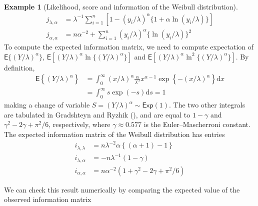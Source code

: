 \documentclass[
  11pt,
  letterpaper,
]{scrbook}
\theoremstyle{definition}
\theoremstyle{plain}
\theoremstyle{plain}
\theoremstyle{definition}
\newtheorem{example}{Example}[chapter]
\theoremstyle{definition}
\theoremstyle{remark}
\begin{document}
\begin{example}[Likelihood, score and information of the Weibull
distribution]
\begin{align*}
j_{\lambda, \alpha} &= \lambda^{-1}\sum_{i=1}^n [1-(y_i/\lambda)^\alpha\{1+\alpha\ln(y_i/\lambda)\}] \\
j_{\alpha,\alpha} &= n\alpha^{-2} + \sum_{i=1}^n (y_i/\lambda)^\alpha \{\ln(y_i/\lambda)\}^2
\end{align*} To compute the expected information matrix, we need to
compute expectation of \(\mathsf{E}\{(Y/\lambda)^\alpha\}\),
\(\mathsf{E}[(Y/\lambda)^\alpha\ln\{(Y/\lambda)^\alpha\}]\) and
\(\mathsf{E}[(Y/\lambda)^\alpha\ln^2\{(Y/\lambda)^\alpha\}]\). By
definition, \begin{align*}
\mathsf{E}\left\{(Y/\lambda)^\alpha\right\} & = \int_0^\infty (x/\lambda)^\alpha \frac{\alpha}{\lambda^\alpha} x^{\alpha-1}\exp\left\{-(x/\lambda)^\alpha\right\} \mathrm{d} x \\
 &= \int_0^\infty s\exp(-s) \mathrm{d} s =1
\end{align*} making a change of variable
\(S = (Y/\lambda)^\alpha\sim \mathsf{Exp}(1)\). The two other integrals
are tabulated in Gradshteyn and Ryzhik
(), and are equal to
\(1-\gamma\) and \(\gamma^2-2\gamma + \pi^2/6\), respectively, where
\(\gamma \approx 0.577\) is the Euler--Mascherroni constant. The
expected information matrix of the Weibull distribution has entries
\begin{align*}
i_{\lambda, \lambda} & = n \lambda^{-2}\alpha\left\{ (\alpha+1)-1\right\} \\
i_{\lambda, \alpha} & = -n\lambda^{-1} (1-\gamma) \\
i_{\alpha, \alpha} & = n\alpha^{-2}(1 + \gamma^2-2\gamma+\pi^2/6)
\end{align*}

We can check this result numerically by comparing the expected value of
the observed information matrix


\end{example}
\end{document}
